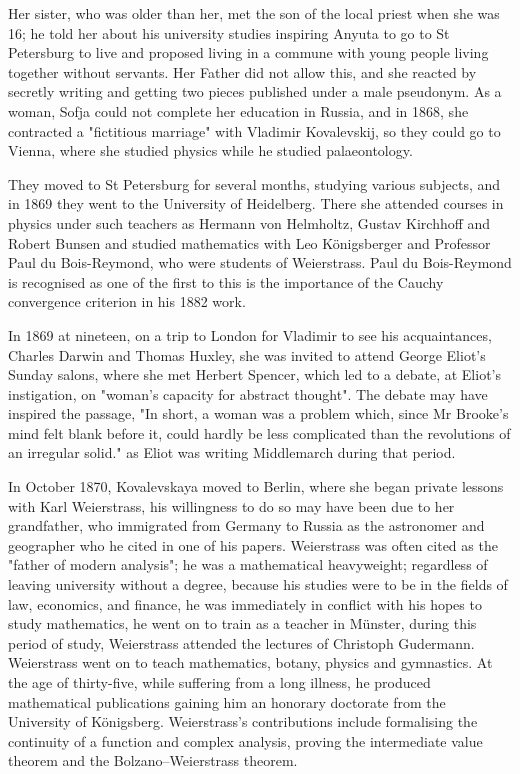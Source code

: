 \documentclass[12pt,a4paper]{article}
\begin{document}
Her sister, who was older than her, met the son of the local priest when she was 16; he told her about his university studies inspiring Anyuta to go to St Petersburg to live and proposed living in a commune with young people living together without servants. Her Father did not allow this, and she reacted by secretly writing and getting two pieces published under a male pseudonym. As a woman, Sofja could not complete her education in Russia, and in 1868, she contracted a "fictitious marriage" with Vladimir Kovalevskij, so they could go to Vienna, where she studied physics while he studied palaeontology. 

They moved to St Petersburg for several months, studying various subjects, and in 1869 they went to the University of Heidelberg. There she attended courses in physics under such teachers as Hermann von Helmholtz, Gustav Kirchhoff and Robert Bunsen and studied mathematics with Leo Königsberger and Professor Paul du Bois-Reymond, who were students of Weierstrass. Paul du Bois-Reymond is recognised as one of the first to this is the importance of the Cauchy convergence criterion in his 1882 work.

In 1869 at nineteen, on a trip to London for Vladimir to see his acquaintances, Charles Darwin and Thomas Huxley, she was invited to attend George Eliot's Sunday salons, where she met Herbert Spencer, which led to a debate, at Eliot's instigation, on "woman's capacity for abstract thought". The debate may have inspired the passage, "In short, a woman was a problem which, since Mr Brooke's mind felt blank before it, could hardly be less complicated than the revolutions of an irregular solid." as Eliot was writing Middlemarch during that period.

In October 1870, Kovalevskaya moved to Berlin, where she began private lessons with Karl Weierstrass, his willingness to do so may have been due to her grandfather, who immigrated from Germany to Russia as the astronomer and geographer who he cited in one of his papers. Weierstrass was often cited as the "father of modern analysis"; he was a mathematical heavyweight; regardless of leaving university without a degree, because his studies were to be in the fields of law, economics, and finance, he was immediately in conflict with his hopes to study mathematics, he went on to train as a teacher in Münster, during this period of study, Weierstrass attended the lectures of Christoph Gudermann. Weierstrass went on to teach mathematics, botany, physics and gymnastics. At the age of thirty-five, while suffering from a long illness, he produced mathematical publications gaining him an honorary doctorate from the University of Königsberg. Weierstrass's contributions include formalising the continuity of a function and complex analysis, proving the intermediate value theorem and the Bolzano–Weierstrass theorem.
\end{document}
